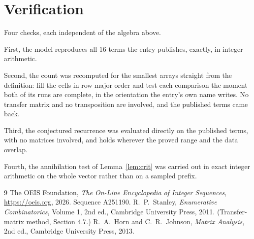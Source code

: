 \documentclass[11pt,a4paper]{article}
\theoremstyle{plain}
\theoremstyle{definition}
\begin{document}
\section{Verification}

Four checks, each independent of the algebra above.

First, the model reproduces all $16$ terms the entry publishes, exactly, in integer
arithmetic.

Second, the count was recomputed for the smallest arrays straight from the definition: fill the
cells in row major order and test each comparison the moment both of its runs are complete,
in the orientation the entry's own name writes. No transfer matrix and no transposition are
involved, and the published terms came back.

Third, the conjectured recurrence was evaluated directly on the published terms, with no
matrices involved, and holds wherever the proved range and the data overlap.

Fourth, the annihilation test of Lemma~\ref{lem:crit} was carried out in exact integer
arithmetic on the whole vector rather than on a sampled prefix.

\begin{thebibliography}{9}
 The OEIS Foundation, \emph{The On-Line Encyclopedia of Integer
Sequences}, \url{https://oeis.org}, 2026. Sequence A251190.
 R.~P.~Stanley, \emph{Enumerative Combinatorics}, Volume 1, 2nd ed.,
Cambridge University Press, 2011. (Transfer-matrix method, Section 4.7.)
 R.~A.~Horn and C.~R.~Johnson, \emph{Matrix Analysis}, 2nd ed., Cambridge
University Press, 2013.
\end{thebibliography}
\end{document}
